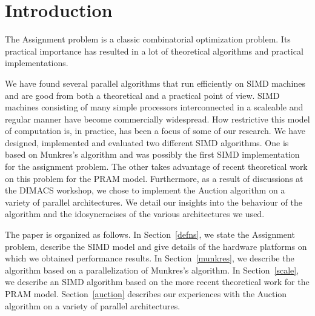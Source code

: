 \section{Introduction}
\label{intro}
The Assignment problem is a classic combinatorial optimization
problem. Its practical importance has resulted in a lot of theoretical
algorithms and practical implementations.

We have found several parallel algorithms that run efficiently on SIMD
machines and are good from both a theoretical and a practical point of
view.
SIMD machines consisting of many simple processors interconnected in
a scaleable and regular manner have become commercially widespread.
How restrictive this model of 
computation is, in practice, has been a focus of some of our research.  
We have designed, implemented and evaluated two different SIMD algorithms.
One is based on Munkres's \cite{mu57} algorithm and was possibly the first
SIMD implementation for the assignment problem.  The other \cite{br88}
takes advantage of recent theoretical work \cite{gpv88} on this
problem for the PRAM model.  Furthermore, as a result of discussions at the 
DIMACS workshop, we chose to implement the Auction algorithm \cite{be91}
on a variety of parallel architectures. We detail our insights into
the behaviour of the algorithm and the idosyncracises of the various
architectures we used.

The paper is organized as follows.  
In Section~\ref{defns}, we state the Assignment problem, describe 
the SIMD model and give details of the 
hardware platforms on which we obtained performance results.  
In Section~\ref{munkres}, we describe the algorithm based on
a parallelization of Munkres's algorithm.
In Section~\ref{scale}, we describe an SIMD algorithm based on 
the more recent theoretical work for the PRAM 
model.  Section~\ref{auction} describes our experiences with the
Auction algorithm on a variety of parallel architectures.

